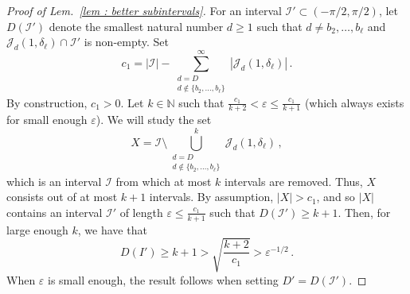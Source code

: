 \documentclass[a4paper,UKenglish,cleveref, autoref, thm-restate]{lipics-v2021}
\begin{document}
\begin{proof}[Proof of Lem.~\ref{lem : better subintervals}]
      For an interval $\mathcal{I}'\subset (-\pi/2,\pi/2)$, let $D(\mathcal{I}')$ denote the smallest natural number $d \ge 1$ such that $d \ne b_2,\dots,b_\ell$ and $\mathcal{J}_d(1, \delta_\ell) \cap \mathcal{I}'$ is non-empty.
      Set 
      \begin{equation*}
          c_1 = |\mathcal{I}| - \sum_{\substack{d = D \\ d \not\in \{b_2, \dots, b_\ell \}}}^\infty|\mathcal{J}_d(1, \delta_\ell)| \, .
      \end{equation*}
      By construction, $c_1 > 0$.
      Let $k \in \mathbb{N}$ such that $\frac{c_1}{k+2} < \varepsilon \le \frac{c_1}{k+1}$ (which always exists for small enough $\varepsilon$).
      We will study the set 
      \begin{equation*}
          X = \mathcal{I}\setminus \bigcup_{\substack{d = D \\ d \not\in \{b_2, \dots, b_\ell \}}}^k \mathcal{J}_d(1, \delta_\ell)\,,
      \end{equation*}
      which is an interval $\mathcal{I}$ from which at most $k$ intervals are removed. 
      Thus, $X$ consists out of at most $k+1$ intervals.
      By assumption, $|X| > c_1$, and so $|X|$ contains an interval $\mathcal{I}'$ of length $\varepsilon \le \frac{c_1}{k+1}$ such that $D(\mathcal{I}') \ge k+1$.
      Then, for large enough $k$, we have that
      \begin{equation*}
          D(I') \ge k+1 > \sqrt{\frac{k+2}{c_1}} > \varepsilon^{-1/2}\,.
      \end{equation*}
      When $\varepsilon$ is small enough, the result follows when setting $D' = D(\mathcal{I}')$.
  \end{proof}
\end{document}
